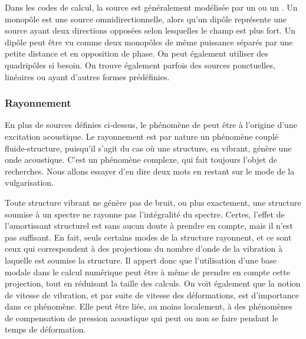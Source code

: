 Dans les codes de calcul, la source est généralement modélisée par un  ou un . Un monopôle est une source omnidirectionnelle, alors qu'un dipôle représente une source ayant deux directions opposées selon lesquelles le champ est plus fort. Un dipôle peut être vu comme deux monopôles de même puissance séparés par une petite distance et en opposition de phase. On peut également utiliser des quadripôles si besoin.
   On trouve également parfois des sources ponctuelles, linéaires ou ayant d'autres formes prédéfinies.
   
\medskip
\subsubsection{Rayonnement}

En plus de sources définies ci-dessus, le phénomène de  peut être à l'origine d'une excitation acoustique. Le rayonnement est par nature un phénomène couplé fluide-structure, puisqu'il s'agit du cas où une structure, en vibrant, génère une onde acoustique. C'est un phénomène complexe, qui fait toujours l'objet de recherches. Nous allons essayer d'en dire deux mots en restant sur le mode de la vulgarisation.

\begin{remarque}
Toute structure vibrant ne génère pas de bruit, ou plus exactement, une structure soumise à un spectre ne rayonne pas l'intégralité du spectre. Certes, l'effet de l'amortissant structurel est sans aucun doute à prendre en compte, mais il n'est pas suffisant. En fait, seuls certains modes de la structure rayonnent, et ce sont ceux qui correspondent à des projections du nombre d'onde de la vibration à laquelle est soumise la structure. Il appert donc que l'utilisation d'une base modale dans le calcul numérique peut être à même de prendre en compte cette projection, tout en réduisant la taille des calculs. On voit également que la notion de vitesse de vibration, et par suite de vitesse des déformations, est d'importance dans ce phénomène. Elle peut être liée, au moins localement, à des phénomènes de compensation de pression acoustique qui peut ou non se faire pendant le temps de déformation.
\end{remarque}

